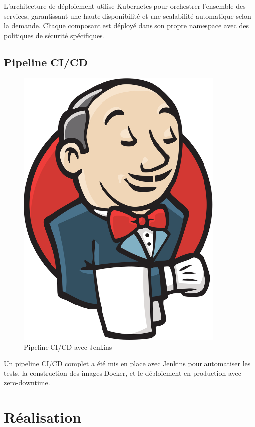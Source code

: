 L'architecture de déploiement utilise Kubernetes pour orchestrer l'ensemble des services, garantissant une haute disponibilité et une scalabilité automatique selon la demande. Chaque composant est déployé dans son propre namespace avec des politiques de sécurité spécifiques.

\subsection{Pipeline CI/CD}

\begin{figure}[H]
\centering
\includegraphics[width=0.9\textwidth]{assets/images/jenkins.png}
\caption{Pipeline CI/CD avec Jenkins}
\label{fig:cicd-pipeline}
\end{figure}

Un pipeline CI/CD complet a été mis en place avec Jenkins pour automatiser les tests, la construction des images Docker, et le déploiement en production avec zero-downtime.

\section{Réalisation}

